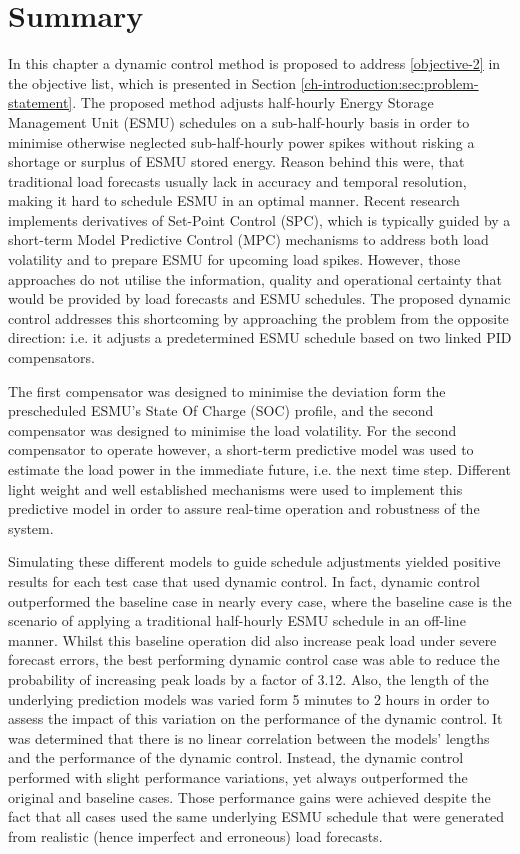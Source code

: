 \section{Summary}
\label{ch2:sec:summary}

In this chapter a dynamic control method is proposed to address \ref{objective-2} in the objective list, which is presented in Section \ref{ch-introduction:sec:problem-statement}.
The proposed method adjusts half-hourly Energy Storage Management Unit (ESMU) schedules on a sub-half-hourly basis in order to minimise otherwise neglected sub-half-hourly power spikes without risking a shortage or surplus of ESMU stored energy.
Reason behind this were, that traditional load forecasts usually lack in accuracy and temporal resolution, making it hard to schedule ESMU in an optimal manner.
Recent research implements derivatives of Set-Point Control (SPC), which is typically guided by a short-term Model Predictive Control (MPC) mechanisms to address both load volatility and to prepare ESMU for upcoming load spikes.
However, those approaches do not utilise the information, quality and operational certainty that would be provided by load forecasts and ESMU schedules.
The proposed dynamic control addresses this shortcoming by approaching the problem from the opposite direction: i.e. it adjusts a predetermined ESMU schedule based on two linked PID compensators.

The first compensator was designed to minimise the deviation form the prescheduled ESMU's State Of Charge (SOC) profile, and the second compensator was designed to minimise the load volatility.
For the second compensator to operate however, a short-term predictive model was used to estimate the load power in the immediate future, i.e. the next time step.
Different light weight and well established mechanisms were used to implement this predictive model in order to assure real-time operation and robustness of the system.

Simulating these different models to guide schedule adjustments yielded positive results for each test case that used dynamic control.
In fact, dynamic control outperformed the baseline case in nearly every case, where the baseline case is the scenario of applying a traditional half-hourly ESMU schedule in an off-line manner.
Whilst this baseline operation did also increase peak load under severe forecast errors, the best performing dynamic control case was able to reduce the probability of increasing peak loads by a factor of 3.12.
Also, the length of the underlying prediction models was varied form 5 minutes to 2 hours in order to assess the impact of this variation on the performance of the dynamic control.
It was determined that there is no linear correlation between the models' lengths and the performance of the dynamic control.
Instead, the dynamic control performed with slight performance variations, yet always outperformed the original and baseline cases.
Those performance gains were achieved despite the fact that all cases used the same underlying ESMU schedule that were generated from realistic (hence imperfect and erroneous) load forecasts.


